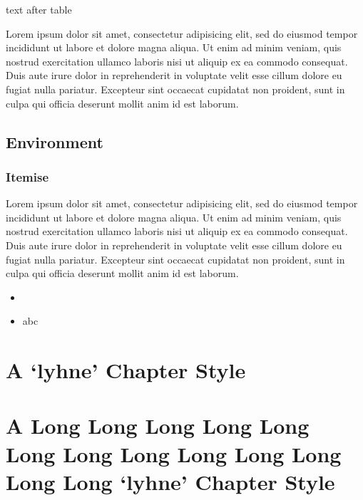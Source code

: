 \documentclass[10pt,a4paper,extrafontsizes,oldfontcommands,oneside]{memoir}
\begin{document}
text after table

Lorem ipsum dolor sit amet, consectetur adipisicing elit, sed do eiusmod tempor incididunt ut labore et dolore magna aliqua. Ut enim ad minim veniam, quis nostrud exercitation ullamco laboris nisi ut aliquip ex ea commodo consequat. Duis aute irure dolor in reprehenderit in voluptate velit esse cillum dolore eu fugiat nulla pariatur. Excepteur sint occaecat cupidatat non proident, sunt in culpa qui officia deserunt mollit anim id est laborum.




\section{Environment} %
\label{sec:environment}

\subsection{Itemise} %
\label{sub:itemise}

Lorem ipsum dolor sit amet, consectetur adipisicing elit, sed do eiusmod tempor incididunt ut labore et dolore magna aliqua. Ut enim ad minim veniam, quis nostrud exercitation ullamco laboris nisi ut aliquip ex ea commodo consequat. Duis aute irure dolor in reprehenderit in voluptate velit esse cillum dolore eu fugiat nulla pariatur. Excepteur sint occaecat cupidatat non proident, sunt in culpa qui officia deserunt mollit anim id est laborum.

\begin{itemize}
	\item 
	\item abc
\end{itemize}




\chapter{A `lyhne' Chapter Style} %
\label{chap:a_lyhne_chapter_style}



\chapter{A Long Long Long Long Long Long Long Long Long Long Long Long Long `lyhne' Chapter Style} %
\label{chap:a_long_lyhne_chapter_style}
\end{document}
